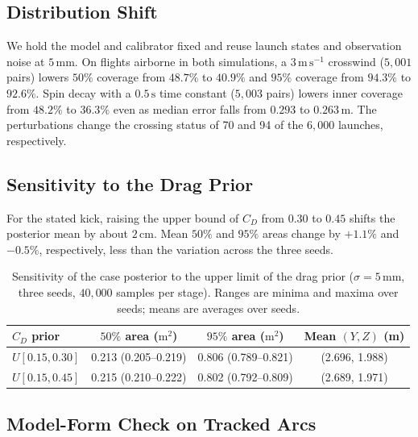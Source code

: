 \documentclass[11pt,a4paper]{article}
\begin{document}
\subsection{Distribution Shift}
\label{sec:shift}

We hold the model and calibrator fixed and reuse launch states and observation noise at $5\,\mathrm{mm}$. On flights airborne in both simulations, a $3\,\mathrm{m\,s^{-1}}$ crosswind ($5{,}001$ pairs) lowers $50\%$ coverage from $48.7\%$ to $40.9\%$ and $95\%$ coverage from $94.3\%$ to $92.6\%$. Spin decay with a $0.5\,\mathrm{s}$ time constant ($5{,}003$ pairs) lowers inner coverage from $48.2\%$ to $36.3\%$ even as median error falls from $0.293$ to $0.263\,\mathrm{m}$. The perturbations change the crossing status of 70 and 94 of the $6{,}000$ launches, respectively.

\subsection{Sensitivity to the Drag Prior}

For the stated kick, raising the upper bound of $C_D$ from $0.30$ to $0.45$ shifts the posterior mean by about $2\,\mathrm{cm}$. Mean $50\%$ and $95\%$ areas change by $+1.1\%$ and $-0.5\%$, respectively, less than the variation across the three seeds.

\begin{table}[htbp]
  \centering
  \caption{Sensitivity of the case posterior to the upper limit of the drag prior ($\sigma=5\,\mathrm{mm}$, three seeds, $40{,}000$ samples per stage). Ranges are minima and maxima over seeds; means are averages over seeds.}
  \label{tab:cdprior}
  \begin{tabular}{lccc}
    \toprule
    $C_D$ prior & $50\%$ area ($\mathrm{m^2}$) & $95\%$ area ($\mathrm{m^2}$) & Mean $(Y,Z)$ (m) \\
    \midrule
    $U[0.15,0.30]$ & 0.213 (0.205--0.219) & 0.806 (0.789--0.821) & (2.696, 1.988) \\
    $U[0.15,0.45]$ & 0.215 (0.210--0.222) & 0.802 (0.792--0.809) & (2.689, 1.971) \\
    \bottomrule
  \end{tabular}
\end{table}


\subsection{Model-Form Check on Tracked Arcs}
\label{sec:issia}
\end{document}
